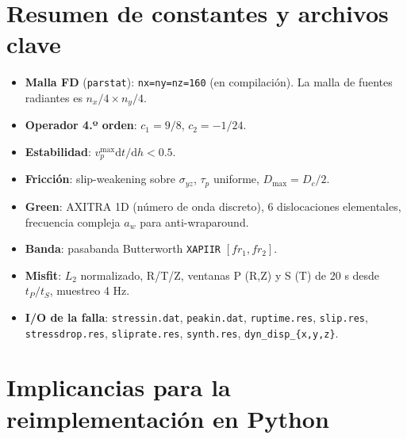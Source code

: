 \documentclass[11pt,a4paper]{article}
\newcommand{\dd}{\mathrm{d}}
\begin{document}
\section{Resumen de constantes y archivos clave}

\begin{itemize}
  \item \textbf{Malla FD} (\texttt{parstat}): \texttt{nx=ny=nz=160} (en
        compilación). La malla de fuentes radiantes es $n_x/4 \times n_y/4$.
  \item \textbf{Operador 4.º orden}: $c_1=9/8$, $c_2=-1/24$.
  \item \textbf{Estabilidad}: $v_p^{\max}\dd t/\dd h < 0.5$.
  \item \textbf{Fricción}: slip-weakening sobre $\sigma_{yz}$, $\tau_p$ uniforme,
        $D_{\max}=D_c/2$.
  \item \textbf{Green}: AXITRA 1D (número de onda discreto), 6 dislocaciones
        elementales, frecuencia compleja $a_w$ para anti-wraparound.
  \item \textbf{Banda}: pasabanda Butterworth \texttt{XAPIIR} $[fr_1,fr_2]$.
  \item \textbf{Misfit}: $L_2$ normalizado, R/T/Z, ventanas P (R,Z) y S (T) de
        20 s desde $t_P/t_S$, muestreo 4 Hz.
  \item \textbf{I/O de la falla}: \texttt{stressin.dat}, \texttt{peakin.dat},
        \texttt{ruptime.res}, \texttt{slip.res}, \texttt{stressdrop.res},
        \texttt{sliprate.res}, \texttt{synth.res}, \texttt{dyn\_disp\_\{x,y,z\}}.
\end{itemize}

\section{Implicancias para la reimplementación en Python}
\end{document}
